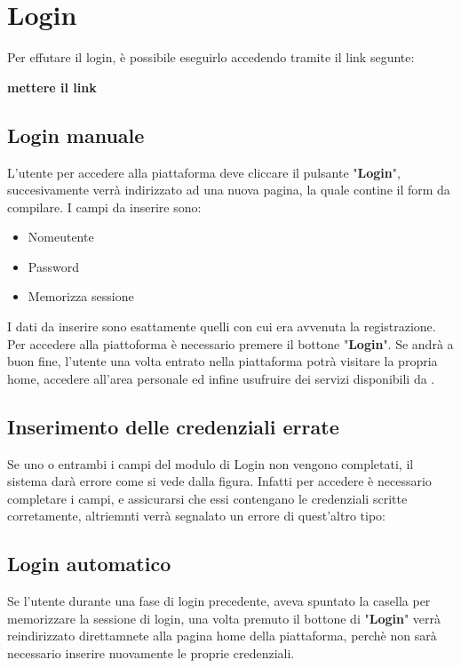 \section{Login} {
    Per effutare il login, è possibile eseguirlo accedendo tramite il link segunte: 
    \begin{center}
        \textbf{mettere il link}
    \end{center}
    \subsection{Login manuale} {
        L'utente per accedere alla piattaforma deve cliccare il pulsante "\textbf{Login}", succesivamente verrà indirizzato ad una nuova pagina, 
        la quale contine il form da compilare. I campi da inserire sono: 
        \begin{itemize}
            \item Nomeutente
            \item Password
            \item Memorizza sessione
        \end{itemize}
        I dati da inserire sono esattamente quelli con cui era avvenuta la registrazione. \aCapo
        Per accedere alla piattoforma è necessario premere il bottone "\textbf{Login}". \aCapo
        Se andrà a buon fine, l'utente una volta entrato nella piattaforma potrà visitare la propria home, accedere all'area personale ed infine usufruire dei servizi disponibili da \platform.
        \subsection{Inserimento delle credenziali errate} {
            Se uno o entrambi i campi del modulo di Login non vengono completati, il sistema darà errore come si vede dalla figura. Infatti per accedere è necessario completare i campi, e assicurarsi
            che essi contengano le credenziali scritte corretamente, altriemnti verrà segnalato un errore di quest'altro tipo: 
        }   
    }

    \subsection{Login automatico} {
        Se l'utente durante una fase di login precedente, aveva spuntato la casella per memorizzare la sessione di login, una volta premuto il 
        bottone di "\textbf{Login}" verrà reindirizzato direttamnete alla pagina home della piattaforma, perchè non sarà necessario inserire nuovamente le proprie credenziali.
    
}}
